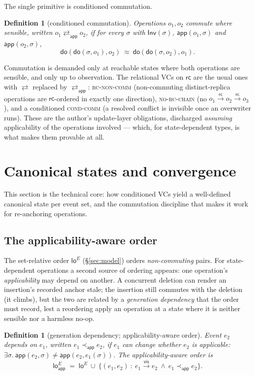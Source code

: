 \documentclass[11pt]{article}
\newtheorem{definition}[theorem]{Definition}
\newcommand{\vis}{\xrightarrow{\mathsf{vis}}}
\newcommand{\rc}{\xrightarrow{\mathsf{rc}}}
\newcommand{\comm}{\rightleftarrows}
\newcommand{\dolab}{\mathsf{do}}
\newcommand{\Inv}{\mathsf{Inv}}
\newcommand{\app}{\mathsf{app}}
\newcommand{\commOn}[1]{\comm_{#1}}
\newcommand{\loE}[1]{\mathsf{lo}^{#1}}
\newcommand{\loA}[1]{\mathsf{lo}_{\!\app}^{#1}}
\newcommand{\eqobs}{\approx}
\begin{document}
The single primitive is conditioned commutation.

\begin{definition}[conditioned commutation]
\label{def:commOn}
Operations $o_1,o_2$ \emph{commute where sensible}, written $o_1 \commOn{\app}
o_2$, if for every $\sigma$ with $\Inv(\sigma)$, $\app(o_1,\sigma)$ and
$\app(o_2,\sigma)$,
\[
  \dolab(\dolab(\sigma,o_1),o_2)\ \eqobs\ \dolab(\dolab(\sigma,o_2),o_1).
\]
\end{definition}

Commutation is demanded only at reachable states where both operations are
sensible, and only up to observation. The relational VCs on $\mathsf{rc}$ are the
usual ones with $\comm$ replaced by $\commOn{\app}$: \textsc{rc-non-comm}
(non-commuting distinct-replica operations are $\mathsf{rc}$-ordered in exactly
one direction), \textsc{no-rc-chain} (no $o_1\rc o_2 \rc o_3$), and a conditioned
\textsc{cond-comm} (a resolved conflict is invisible once an overwriter runs).
These are the author's update-layer obligations, discharged \emph{assuming}
applicability of the operations involved --- which, for state-dependent types, is
what makes them provable at all.

\section{Canonical states and convergence}
\label{sec:conv}

This section is the technical core: how conditioned VCs yield a well-defined
canonical state per event set, and the commutation discipline that makes it work
for re-anchoring operations.

\subsection{The applicability-aware order}

The set-relative order $\loE{E}$ (\S\ref{sec:model}) orders \emph{non-commuting}
pairs. For state-dependent operations a second source of ordering appears: one
operation's \emph{applicability} may depend on another. A concurrent deletion can
render an insertion's recorded anchor stale; the insertion still commutes with
the deletion (it climbs), but the two are related by a \emph{generation
dependency} that the order must record, lest a reordering apply an operation at a
state where it is neither sensible nor a harmless no-op.

\begin{definition}[generation dependency; applicability-aware order]
\label{def:loA}
Event $e_2$ \emph{depends on} $e_1$, written $e_1 \prec_{\app} e_2$, if $e_1$ can
change whether $e_2$ is applicable: $\exists\sigma.\ \app(e_2,\sigma)\neq
\app(e_2,e_1(\sigma))$. The \emph{applicability-aware order} is
\[
  \loA{E} \;=\; \loE{E}\ \cup\ \{(e_1,e_2)\ :\ e_1\vis e_2\ \wedge\ e_1
    \prec_{\app} e_2\}.
\]
\end{definition}
\end{document}
